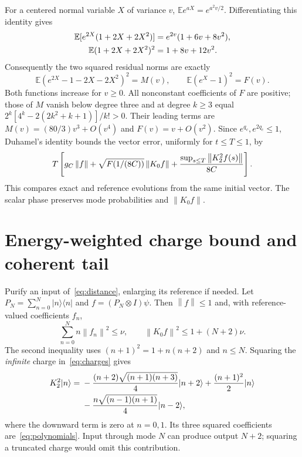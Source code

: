 \documentclass[11pt]{article}
\newcommand{\norm}[1]{\left\lVert#1\right\rVert}
\begin{document}
For a centered normal variable $X$ of variance $v$,
$\mathbb E e^{aX}=e^{a^2v/2}$. Differentiating this identity gives
\begin{align}
 \mathbb E[e^{2X}(1+2X+2X^2)]&=e^{2v}(1+6v+8v^2),\notag\\
 \mathbb E(1+2X+2X^2)^2&=1+8v+12v^2.
\end{align}
Consequently the two squared residual norms are exactly
\begin{equation}
 \mathbb E(e^{2X}-1-2X-2X^2)^2=M(v),\qquad
 \mathbb E(e^X-1)^2=F(v).\label{eq:momentderivation}
\end{equation}
Both functions increase for $v\ge0$. All nonconstant coefficients of
$F$ are positive; those of $M$ vanish below degree three and at degree
$k\ge3$ equal $2^k[4^k-2(2k^2+k+1)]/k!>0$. Their leading terms are
$M(v)=(80/3)v^3+O(v^4)$ and $F(v)=v+O(v^2)$.
Since $e^{q_c},e^{2q_c}\le1$, Duhamel's identity bounds the vector error,
uniformly for $t\le T\le1$, by
\begin{equation}
 T\left[g_C\norm f+\sqrt{F(1/(8C))}\norm{K_0f}
                  +{\sup_{s\le T}\norm{K_2^2f(s)}\over8C}\right].
 \label{eq:duhamel}
\end{equation}
This compares exact and reference evolutions from the same initial vector.
The scalar phase preserves mode probabilities and $\norm{K_0f}$.

\section{Energy-weighted charge bound and coherent tail}
Purify an input of~\eqref{eq:distance}, enlarging its reference if needed.
Let $P_N=\sum_{n=0}^N|n\rangle\langle n|$ and $f=(P_N\otimes I)\psi$.
Then $\norm f\le1$ and, with reference-valued coefficients $f_n$,
\begin{equation}
 \sum_{n=0}^N n\norm{f_n}^2\le\nu,\qquad
 \norm{K_0f}^2\le1+(N+2)\nu.\label{eq:weightedK0}
\end{equation}
The second inequality uses $(n+1)^2=1+n(n+2)$ and $n\le N$.
Squaring the \emph{infinite} charge in~\eqref{eq:charges} gives
\begin{align}
 K_2^2|n\rangle={}&-{(n+2)\sqrt{(n+1)(n+3)}\over4}|n+2\rangle
               +{(n+1)^2\over2}|n\rangle\notag\\
 &-{n\sqrt{(n-1)(n+1)}\over4}|n-2\rangle,\label{eq:K2square}
\end{align}
where the downward term is zero at $n=0,1$. Its three squared coefficients
are~\eqref{eq:polynomials}. Input through mode $N$ can produce output
$N+2$; squaring a truncated charge would omit this contribution.
\end{document}
